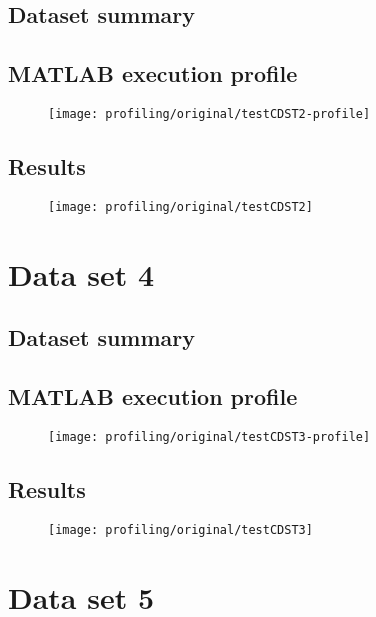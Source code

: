 \subsection{Dataset summary}

\subsection{MATLAB execution profile}
\begin{figure}[H]
	\centering
	\texttt{[image: profiling/original/testCDST2-profile]}
\end{figure}

\subsection{Results}
\begin{figure}[H]
	\centering
	\texttt{[image: profiling/original/testCDST2]}
\end{figure}

\section{Data set 4}

\subsection{Dataset summary}

\subsection{MATLAB execution profile}
\begin{figure}[H]
	\centering
	\texttt{[image: profiling/original/testCDST3-profile]}
\end{figure}

\subsection{Results}
\begin{figure}[H]
	\centering
	\texttt{[image: profiling/original/testCDST3]}
\end{figure}

\section{Data set 5}

